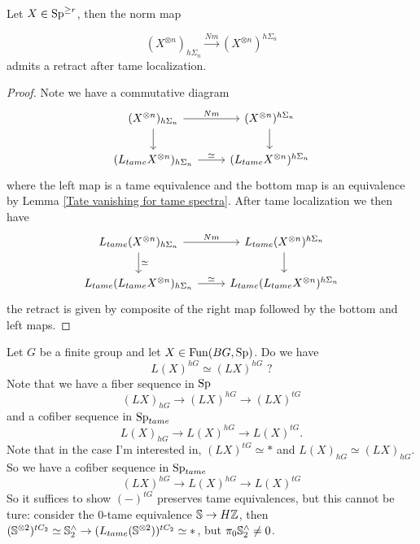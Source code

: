 \begin{proposition}
	Let $X\in \operatorname{Sp}^{\geq r}$, then the norm map	
	
	$$
	(X^{\otimes n})_{h\Sigma_n} \xrightarrow{Nm} (X^{\otimes n})^{h\Sigma_n} 
	$$
	admits a retract after tame localization. 
\end{proposition}
\begin{proof}
	Note we have a commutative diagram
	\[
	\begin{tikzcd}
		(X^{\otimes n})_{h\Sigma_n} & (X^{\otimes n})^{h\Sigma_n}\\
		(L_{tame}X^{\otimes n})_{h\Sigma_n} & (L_{tame}X^{\otimes n})^{h\Sigma_n}
		\arrow[from=1-1, to=1-2, "Nm"]
		\arrow[from=1-1, to=2-1]
		\arrow[from=2-1, to=2-2, "\simeq"]
		\arrow[from=1-2, to=2-2]
	\end{tikzcd}
	\]
	where the left map is a tame equivalence and the bottom map is an equivalence by Lemma \ref{Tate vanishing for tame spectra}.
After tame localization we then have 	
\[
	\begin{tikzcd}
		L_{tame}(X^{\otimes n})_{h\Sigma_n} & L_{tame}(X^{\otimes n})^{h\Sigma_n}\\
		L_{tame}(L_{tame}X^{\otimes n})_{h\Sigma_n} & L_{tame}(L_{tame}X^{\otimes n})^{h\Sigma_n}
		\arrow[from=1-1, to=1-2, "Nm"]
		\arrow[from=1-1, to=2-1, "\simeq"]
		\arrow[from=2-1, to=2-2, "\simeq"]
		\arrow[from=1-2, to=2-2]
	\end{tikzcd}
\]
the retract is given by composite of the right map followed by the bottom and left maps.
\end{proof}

\clearpage
\begin{question}
	Let $G$ be a finite group and let $X\in \operatorname{Fun}(BG,\operatorname{Sp})$. Do we have 
	$$
	L(X)^{hG}\simeq (LX)^{hG} \text{   ?}
	$$
	Note that we have a fiber sequence in $\operatorname{Sp}$
	$$
	(LX)_{hG} \to (LX)^{hG} \to (LX)^{tG}
	$$
	and a cofiber sequence in $\operatorname{Sp}_{tame}$
	$$
	L(X)_{hG} \to L(X)^{hG} \to L(X)^{tG}.
	$$
	Note that in the case I'm interested in, $(LX)^{tG}\simeq *$ and $L(X)_{hG}\simeq (LX)_{hG}$.
	So we have a cofiber sequence in $\operatorname{Sp}_{tame}$
	$$
	(LX)^{hG} \to L(X)^{hG} \to L(X)^{tG}
	$$
	So it suffices to show $(-)^{tG}$ preserves tame equivalences, but this cannot be ture:
	consider the 0-tame equivalence ${\mathbb{S}}\to H{\mathbb{Z}}$,
	then $({\mathbb{S}}^{\otimes 2})^{tC_2}\simeq {\mathbb{S}}^{\wedge}_{2}\to  (L_{tame}({\mathbb{S}}^{\otimes 2}))^{tC_2}\simeq *$, but $\pi_0 {\mathbb{S}}^{\wedge}_2\neq 0$.
\end{question}


